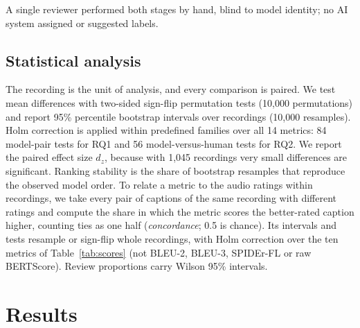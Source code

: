 \documentclass{article}
\begin{document}
A single reviewer performed both stages by hand, blind to model identity; no AI system assigned or suggested labels.

\subsection{Statistical analysis}
\label{ssec:stats}

The recording is the unit of analysis, and every comparison is paired. We test mean differences with two-sided
sign-flip permutation tests (10,000 permutations) and report 95\% percentile bootstrap intervals over recordings
(10,000 resamples). Holm correction is applied within predefined families over all 14 metrics: 84 model-pair tests for
RQ1 and 56 model-versus-human tests for RQ2. We report the paired effect size $d_z$, because with 1,045 recordings very
small differences are significant. Ranking stability is the share of bootstrap resamples that reproduce the observed
model order. To relate a metric to the audio ratings within recordings, we take every pair of captions of the same
recording with different ratings and compute the share in which the metric scores the better-rated caption higher,
counting ties as one half (\emph{concordance}; 0.5 is chance). Its intervals and tests resample or sign-flip whole
recordings, with Holm correction over the ten metrics of Table~\ref{tab:scores} (not BLEU-2, BLEU-3, SPIDEr-FL or
raw BERTScore). Review proportions carry Wilson
95\% intervals.

\section{Results}
\label{sec:results}
\end{document}
